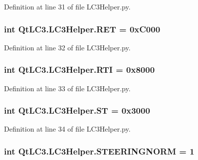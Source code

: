 Definition at line 31 of file L\-C3\-Helper.\-py.

\hypertarget{namespace_qt_l_c3_1_1_l_c3_helper_aefa011a0063f0a58973debd03508c067}{
\subsubsection[{R\-E\-T}]{\setlength{\rightskip}{0pt plus 5cm}int Qt\-L\-C3.\-L\-C3\-Helper.\-R\-E\-T = 0x\-C000}}\label{namespace_qt_l_c3_1_1_l_c3_helper_aefa011a0063f0a58973debd03508c067}


Definition at line 32 of file L\-C3\-Helper.\-py.

\hypertarget{namespace_qt_l_c3_1_1_l_c3_helper_a39240b80276cf60d71330cb051c7f5f8}{
\subsubsection[{R\-T\-I}]{\setlength{\rightskip}{0pt plus 5cm}int Qt\-L\-C3.\-L\-C3\-Helper.\-R\-T\-I = 0x8000}}\label{namespace_qt_l_c3_1_1_l_c3_helper_a39240b80276cf60d71330cb051c7f5f8}


Definition at line 33 of file L\-C3\-Helper.\-py.

\hypertarget{namespace_qt_l_c3_1_1_l_c3_helper_ae050a048ad522e75de8c065c20f01bb8}{
\subsubsection[{S\-T}]{\setlength{\rightskip}{0pt plus 5cm}int Qt\-L\-C3.\-L\-C3\-Helper.\-S\-T = 0x3000}}\label{namespace_qt_l_c3_1_1_l_c3_helper_ae050a048ad522e75de8c065c20f01bb8}


Definition at line 34 of file L\-C3\-Helper.\-py.

\hypertarget{namespace_qt_l_c3_1_1_l_c3_helper_ac1252434698120b0fe5f93491268215f}{
\subsubsection[{S\-T\-E\-E\-R\-I\-N\-G\-N\-O\-R\-M}]{\setlength{\rightskip}{0pt plus 5cm}int Qt\-L\-C3.\-L\-C3\-Helper.\-S\-T\-E\-E\-R\-I\-N\-G\-N\-O\-R\-M = 1}}\label{namespace_qt_l_c3_1_1_l_c3_helper_ac1252434698120b0fe5f93491268215f}


